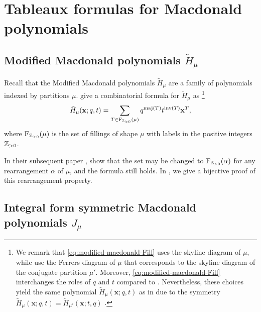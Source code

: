 \section{Tableaux formulas for Macdonald polynomials}

\subsection{Modified Macdonald polynomials \texorpdfstring{\(\tilde{H}_\mu\)}{H̃μ}} \label{subsec:modified-macdonald}

Recall that the Modified Macdonald polynomials \(\tilde{H}_\mu\) are a family of polynomials indexed by partitions \(\mu\).
\citeauthor{HHL05} \cite[Theorem~2.2]{HHL05} give a combinatorial formula for \(\tilde{H}_{\mu}\) as%
\footnote{
	We remark that \eqref{eq:modified-macdonald-Fill} uses the skyline diagram of \(\mu\), while \cite[(14)]{HHL05} use the Ferrers diagram of \(\mu\) that corresponds to the skyline diagram of the conjugate partition \(\mu'\).
	Moreover, \eqref{eq:modified-macdonald-Fill} interchanges the roles of \(q\) and \(t\) compared to \cite[(14)]{HHL05}.
	Nevertheless, these choices yield the same polynomial \(\tilde{H}_{\mu}(\mathbf{x}; q, t)\) as in \cite{HHL05} due to the symmetry \(\tilde{H}_{\mu}(\mathbf{x}; q, t) = \tilde{H}_{\mu'}(\mathbf{x}; t, q)\) \cite[Chapter VI, (8.6)]{Mac04}.
}
\begin{equation} \label{eq:modified-macdonald-Fill}
	\tilde{H}_{\mu}(\mathbf{x}; q, t) =
	\sum_{T \in \Fill[\positives](\mu)} q^{\maj(T)} t^{\inv(T)} \mathbf{x}^T,
\end{equation}
where \(\Fill[\positives](\mu)\) is the set of fillings of shape \(\mu\) with labels in the positive integers \(\mathbb{Z}_{>0}\).

In their subsequent paper \cite{HHL08}, \citeauthor{HHL08} show that the set may be changed to \(\Fill[\positives](\alpha)\) for any rearrangement \(\alpha\) of \(\mu\), and the formula still holds.
In , we give a bijective proof of this rearrangement property.

\subsection{Integral form symmetric Macdonald polynomials \texorpdfstring{\(J_\mu\)}{Jμ}} \label{subsec:integral-form-macdonald}


